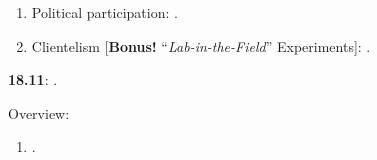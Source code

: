 \documentclass[letterpaper]{article}
\renewenvironment{itemize}{
  \begin{list}{}{
    \setlength{\leftmargin}{1.5em}
  }
}{
  \end{list}
}
\begin{document}
\begin{enumerate}
\begin{itemize}
\begin{enumerate}
          \item[$\bullet$] Political participation: \href{https://onlinelibrary.wiley.com/doi/pdf/10.1111/j.1540-5907.2008.00332.x}{}.


          \item[$\bullet$] Clientelism [{\bf Bonus!} ``\emph{Lab-in-the-Field}'' Experiments]: \href{https://doi.org/10.1177/0010414017695336}{}.


         \end{enumerate}

      \end{itemize}

  \item {\bf 18.11}:  {\color{ForestGreen}{\bf Natural Experiments}}.


      \begin{itemize} 

        \item[$\diamond$] Overview:

        \begin{enumerate}



          \item[$\bullet$] \href{https://doi.org/10.1017/CBO9781139084444}{}. %



\end{enumerate}
\end{itemize}
\end{enumerate}
\end{document}
